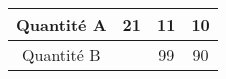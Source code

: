 \begin{tabular}{|c|c|c|c|}
\hline
Quantité A & 21 & 11 & 10 \\ \hline
Quantité B & \kern1cm & 99 & 90 \\ \hline
\end{tabular}

